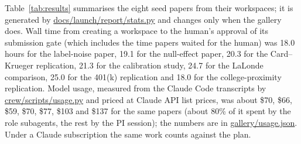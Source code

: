 \documentclass[11pt]{article}
\begin{document}
Table~\ref{tab:results} summarises the eight seed papers from their workspaces; it is
generated by \url{docs/launch/report/stats.py} and changes only when the gallery does.
Wall time from creating a workspace to the human's approval of its submission gate
(which includes the time papers waited for the human) was 18.0 hours for the label-noise
paper, 19.1 for the null-effect paper, 20.3 for the Card--Krueger replication, 21.3 for
the calibration study, 24.7 for the LaLonde comparison, 25.0 for the 401(k)
replication and 18.0 for the college-proximity replication. Model usage, measured from
the Claude Code transcripts by \url{crew/scripts/usage.py} and priced at Claude API list
prices, was about \$70, \$66, \$59, \$70, \$77, \$103 and \$137 for the same papers (about 80\% of it
spent by the role subagents, the rest by the PI session); the numbers are in
\url{gallery/usage.json}. Under a Claude subscription the same work counts against the plan.

\begin{table}[ht]
\centering\small
\caption{Seed papers. Gates: human gates approved of four. Reviews: review rounds over all
stages. Crit./Major/Minor: distinct findings raised by the Reviewer (a finding carried
into later rounds counts once, at its latest severity). Overruled: open critical
findings the human accepted at a gate. Runs: logged runs. Rerun: clean re-execution
from the requirements file. Key: hidden answer key (no-key where none exists).}
\label{tab:results}
\resizebox{\textwidth}{!}{}
\end{table}
\end{document}
